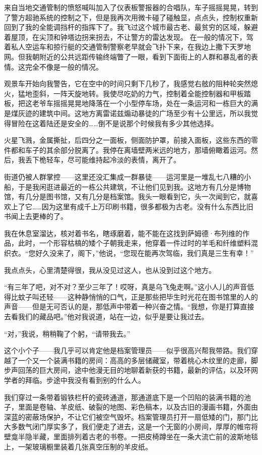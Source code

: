 \documentclass[AutoFakeBold=true]{book}
\begin{document}
来自当地交通管制的愤怒喊叫加入了仪表板警报器的合唱队，车子摇摇晃晃，转到了警方超驰系统的控制之下，但是我再次用微卡碰了碰触显，点点头，控制权重新回到了我的全能调挡杆的指挥下了。我飞过这个城市最古老、最贫穷的区域，躲避着屋顶，在尖顶和钟塔边拐来拐去，不让警方的雷达发现。 在一般的情况下，驾着私人空运车和掠行艇的交通管制警察老早就会飞扑下来，在我边上撒下天罗地网。但我朝附近的公共远距传输终端瞥了一眼，看到下面街上的人群和暴乱者的表情。这完全不像是一般的情况。

观景车开始向我警告，它在空中的时间只剩下几秒了，我感觉右舷的阻种轮突然熄火，猛地歪斜，一阵天旋地转。我使尽吃奶的力气，控制着全能控制器和甲板踏板，把这老爷车摇摇晃晃地降落在一个小型停车场，处在一条运河和一栋巨大的满是煤灰迹的建筑中间。这地方离雷诺兹煽动暴徒的广场至少有十公里远，所以我觉得冒险在这着陆还是安全的……倒不是说那个时候我有多少其他选择。

火星飞溅，金属撕扯，后四分之一面板，侧面防护罩，前接入面板，这些东西的零件都和车子的其余部分脱离了。我停在离墙壁两米远的地方，那墙俯瞰着运河。然后，我丢下桅轻车，尽可能维持起冷淡的表情，离开了。

街道仍被人群掌控——这里还没汇集成一群暴徒——运河里是一堆乱七八糟的小船，于是我闲逛进最近的一栋公共建筑，不让他们见到我。这地方有几分是博物馆，有几分是图书馆，又有几分是档案馆。我头一眼看到它，头一次闻到它，就喜欢上了它……因为这里有成千上万印刷书籍，很多都极为古老。没有什么东西比旧书闻上去更棒的了。

我在休息室溜达，核对着书名，瞎琢磨着，能不能在这找到萨姆德·布列维的作品，此时，一个形容枯槁的矮个子朝我走来，他穿着一件过时的羊毛和纤维塑料混织衣。``您好久没来了，阁下，''他说，``您现在能再次驾临，我们真是三生有幸！''

我点点头，心里清楚得很，我从没见过这人，也从没到过这个地方。

``有三年了吧，对不对？至少三年了！哎呀，真是乌飞兔走啊。''这小人儿的声音低得比蚊子叫还轻——这种静悄悄的口气，正是那些把毕生时光花在图书馆里的人的声音——但是无可否认的是，那低声中带着一种兴奋之情。``我想，你是打算直接去看我们的藏品吧。''他对我说道，站在一边，似乎是要让我过去。

``对，''我说，稍稍鞠了个躬，``请带我去。''

这个小个子——我几乎可以肯定他是档案管理员——似乎很高兴帮我带路。我们穿越了一个又一个装满书籍的房间：高高的多层储藏室，带着桃心木纹里的走廊，脚步声回荡的巨大房间，途中他漫无目的地聊着新获的书籍，最新的评估，以及环网学者的拜临。步途中我没有看到别的什么人。

我们穿过一条带着锻铁栏杆的瓷砖通道，那通道底下是一个凹陷的装满书籍的池子，里面是卷轴、羊皮纸、破裂的地图、彩色稿本，以及古旧的漫画书籍，外面由深蓝的密蔽场保护，不让它们被空气毁坏。档案管理员打开一扇低矮的门，那门比大多数气闭门厚实多了，我们便走了进去，这是一个无窗的小房间，厚厚的帷帘将壁龛半隐半藏，里面排列着古老的书卷。一把皮椅蹲坐在一条大流亡前的波斯地毯上，一架玻璃橱里装着几张真空压制的羊皮纸。
\end{document}
